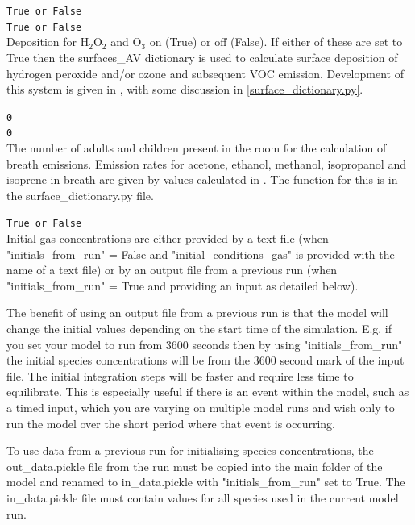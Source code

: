 \documentclass[a4paper]{refart}
\begin{document}
\texttt{True or False}\\
\texttt{True or False}\\
Deposition for H${_2}$O${_2}$ and O${_3}$ on (True) or off (False). If either of these are set to True then the surfaces\_AV dictionary is used to calculate surface deposition of hydrogen peroxide and/or ozone and subsequent VOC emission. Development of this system is given in \cite{Carter2023}, with some discussion in \ref{surface_dictionary.py}.

\texttt{0}\\
\texttt{0}\\
The number of adults and children present in the room for the calculation of breath emissions. Emission rates for acetone, ethanol, methanol, isopropanol and isoprene in breath are given by values calculated in \cite{Carter2023}. The function for this is in the surface\_dictionary.py file.

\label{initials_from_run}
\texttt{True or False}\\
Initial gas concentrations are either provided by a text file (when "initials\_from\_run" = False and "initial\_conditions\_gas" is provided with the name of a text file) or by an output file from a previous run (when "initials\_from\_run" = True and providing an input as detailed below). 

The benefit of using an output file from a previous run is that the model will change the initial values depending on the start time of the simulation. E.g. if you set your model to run from 3600 seconds then by using "initials\_from\_run" the initial species concentrations will be from the 3600 second mark of the input file. The initial integration steps will be faster and require less time to equilibrate. This is especially useful if there is an event within the model, such as a timed input, which you are varying on multiple model runs and wish only to run the model over the short period where that event is occurring. 

To use data from a previous run for initialising species concentrations, the out\_data.pickle file from the run must be copied into the main folder of the model and renamed to in\_data.pickle with "initials\_from\_run" set to True. The in\_data.pickle file must contain values for all species used in the current model run.
\end{document}
